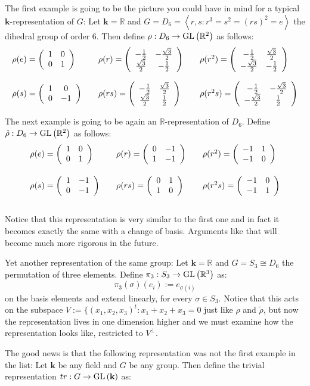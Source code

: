 \begin{examples}
\begin{i_enum}
\item The first example is going to be the picture you could have in mind for a typical $\mathbf{k}$-representation of $G$: Let $\mathbf{k}=\mathbb{R}$ and $G=D_{6}=\left<r,s:r^3=s^2=(rs)^2=e\right>$ the dihedral group of order $6$. Then define $\rho:D_6\to\GL{\mathbb{R}^2}$ as follows:
$$\begin{array}{lclcl}
\rho(e)=\twocols{1}{0}{0}{1}&&\rho(r)=\twocols{-\frac{1}{2}}{\frac{\sqrt{3}}{2}}{-\frac{\sqrt{3}}{2}}{-\frac{1}{2}}&&\rho(r^2)=\twocols{-\frac{1}{2}}{-\frac{\sqrt{3}}{2}}{\frac{\sqrt{3}}{2}}{-\frac{1}{2}}\\[2em]
\rho(s)=\twocols{1}{0}{0}{-1}&&\rho(rs)=\twocols{-\frac{1}{2}}{\frac{\sqrt{3}}{2}}{\frac{\sqrt{3}}{2}}{\frac{1}{2}}&&\rho(r^2s)=\twocols{-\frac{1}{2}}{-\frac{\sqrt{3}}{2}}{-\frac{\sqrt{3}}{2}}{\frac{1}{2}}\\
\end{array}$$
\item The next example is going to be again an $\mathbb{R}$-representation of $D_6$. Define $\tilde{\rho}:D_6\to\GL{\mathbb{R}^2}$ as follows:
$$\begin{array}{lclcl}
\rho(e)=\twocols{1}{0}{0}{1}&&\rho(r)=\twocols{0}{1}{-1}{-1}&&\rho(r^2)=\twocols{-1}{-1}{1}{0}\\[2em]
\rho(s)=\twocols{1}{0}{-1}{-1}&&\rho(rs)=\twocols{0}{1}{1}{0}&&\rho(r^2s)=\twocols{-1}{-1}{0}{1}\\[2em]
\end{array}$$
Notice that this representation is very similar to the first one and in fact it becomes exactly the same with a change of basis. Arguments like that will become much more rigorous in the future.
\item Yet another representation of the same group: Let $\mathbf{k}=\mathbb{R}$ and $G=S_3\cong D_6$ the permutation of three elements. Define $\pi_3:S_3\to\GL{\mathbb{R}^3}$ as:
$$\pi_3(\sigma)(e_i):=e_{\sigma(i)}$$
on the basis elements and extend linearly, for every $\sigma\in S_3$. Notice that this acts on the subspace $V:=\{(x_1,x_2,x_3)^t:x_1+x_2+x_3=0$ just like $\rho$ and $\tilde{\rho}$, but now the representation lives in one dimension higher and we must examine how the representation looks like, restricted to $V^{\perp}$.
\item The good news is that the following representation was not the first example in the list: Let $\mathbf{k}$ be any field and $G$ be any group. Then define the trivial representation $tr:G\to\GL{\mathbf{k}}$ as:

\end{i_enum}
\end{examples}
